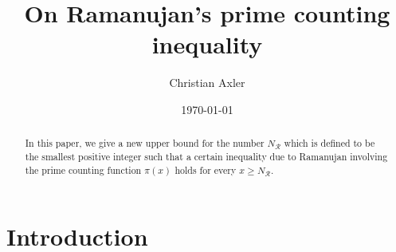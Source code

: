 \documentclass[a4paper,12pt]{amsart}
\title{On Ramanujan's prime counting inequality}
\author{Christian Axler}
\date{\today}
\theoremstyle{definition}
\theoremstyle{remark}
\begin{document}
\begin{abstract}
In this paper, we give a new upper bound for the number $N_{\mathcal{R}}$ which is 
defined to be the smallest positive integer such that a certain inequality due to Ramanujan involving the prime counting function $\pi(x)$ holds for every $x \geq N_{\mathcal{R}}$.
\end{abstract}

\maketitle


\section{Introduction}
\end{document}
